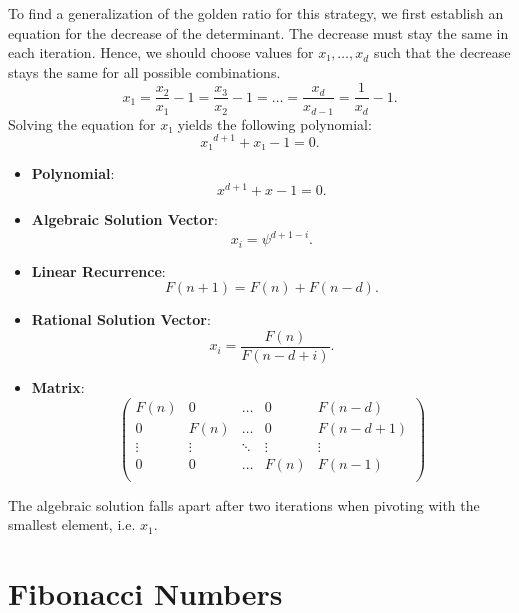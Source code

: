 To find a generalization of the golden ratio for this strategy,
we first establish an equation for the decrease of the determinant.
The decrease must stay the same in each iteration.
Hence, we should choose values for $x₁, \dots, x_d$ such that the decrease
stays the same for all possible combinations.
\[
  x_1 = \frac{x_2}{x_1} - 1 = \frac{x_3}{x_2} - 1 = \dots = \frac{x_d}{x_{d-1}} = \frac{1}{x_d} - 1.
\]
Solving the equation for $x₁$ yields the following polynomial:
\[
  x₁^{d+1} + x₁ - 1 = 0.
\]

\begin{itemize}
  \item \textbf{Polynomial}: \[x^{d+1} + x - 1 = 0.\]
  \item \textbf{Algebraic Solution Vector}: \[x_i = \psi^{d+1-i}.\]
  \item \textbf{Linear Recurrence}: \[F(n + 1) = F(n) + F(n - d).\]
  \item \textbf{Rational Solution Vector}: \[x_i = \frac{F(n)}{F(n-d+i)}.\]
  \item \textbf{Matrix}:
    \[\left(\begin{array}{cccc|c}
      F(n)   & 0      & \dots  & 0      & F(n - d) \\
        0    & F(n)   & \dots  & 0      & F(n - d + 1) \\
      \vdots & \vdots & \ddots & \vdots & \vdots   \\
        0    & 0      & \dots  & F(n)   & F(n - 1) \\
    \end{array}\right)\]
\end{itemize}

The algebraic solution falls apart after two iterations when pivoting with the
smallest element, i.e. $x_1$.

\section{Fibonacci Numbers}


